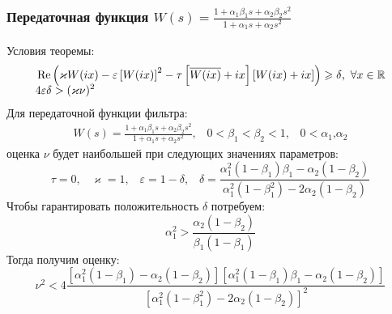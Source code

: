 \documentclass{beamer}
\begin{document}
\begin{frame}
\frametitle{Передаточная функция $W(s) = \frac{1+\alpha_1\beta_1s + \alpha_2\beta_2s^2}{1+\alpha_1s + \alpha_2s^2}$}
Условия теоремы:\vspace{-2mm}
 \begin{align*}
&\operatorname{Re}\left( \varkappa W(ix)- \varepsilon\left[W(ix)\right]^2-\tau\left[ \overline{W(ix)}+ix \right]\left[W(ix)+ix \right]\right) \geqslant \delta \text{,}\enskip\forall x \in \mathbb{R}\\[-2mm]
&4\varepsilon\delta > (\varkappa\nu)^2
\end{align*}
Для передаточной функции фильтра:\vspace{-2mm}
 \begin{equation}\label{filter3}
 \begin{aligned}
W(s) = \frac{1+\alpha_1\beta_1s + \alpha_2\beta_2s^2}{1+\alpha_1s + \alpha_2s^2} \text{,}\quad 0 < \beta_1 < \beta_2 < 1 \text{,}\quad 0 < \alpha_1 \text{,} \alpha_2
 \end{aligned}
\end{equation}
оценка $\nu$ будет наибольшей при следующих значениях параметров:
\vspace{-2mm}
 \begin{equation}\label{filter3-params}
 \tau = 0 \text{,} \quad
 \varkappa = 1 \text{,} \quad
 \varepsilon = 1-\delta \text{,} \quad
 \delta = \frac{\alpha_1^2(1-\beta_1)\beta_1 - \alpha_2(1-\beta_2)}{\alpha_1^2(1-\beta_1^2) - 2\alpha_2(1-\beta_2)}
\end{equation}
Чтобы гарантировать положительность $\delta$ потребуем:\vspace{-2mm}
 \begin{equation}
\alpha_1^2 > \frac{\alpha_2(1-\beta_2)}{\beta_1(1-\beta_1)}
\end{equation}\vspace{-2mm}
Тогда получим оценку:
 \begin{equation*}
\nu^2 < 4\frac{[\alpha_1^2(1-\beta_1) - \alpha_2(1-\beta_2)][\alpha_1^2(1-\beta_1)\beta_1 - \alpha_2(1-\beta_2)]}{[\alpha_1^2(1-\beta_1^2) - 2\alpha_2(1-\beta_2)]^2}
 \end{equation*}
\end{frame}

\end{document}
